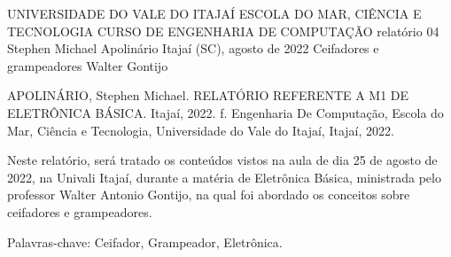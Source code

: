 
\begin{Info}
    {UNIVERSIDADE DO VALE DO ITAJAÍ}
    {ESCOLA DO MAR, CIÊNCIA E TECNOLOGIA}
    {CURSO DE ENGENHARIA DE COMPUTAÇÃO}
    {relatório 04}
    {Stephen Michael Apolinário}
    {Itajaí (SC), agosto de 2022}
    {Ceifadores e grampeadores}
    {Walter Gontijo}
    {}
    \end{Info}
    
    
    
    
    \begin{Resumo}
    
    APOLINÁRIO, Stephen Michael. RELATÓRIO REFERENTE A M1 DE ELETRÔNICA BÁSICA. Itajaí, 2022. \pageref{LastPage} f. Engenharia De Computação, Escola do Mar, Ciência e Tecnologia, Universidade do Vale do Itajaí, Itajaí, 2022.
    
    
    Neste relatório, será tratado os conteúdos vistos na aula de dia 25 de agosto de 2022, na Univali Itajaí, durante a matéria de Eletrônica Básica, ministrada pelo professor Walter Antonio Gontijo, na qual foi abordado os conceitos sobre ceifadores e grampeadores.
    
    Palavras-chave: Ceifador, Grampeador, Eletrônica.
    
    \end{Resumo}
